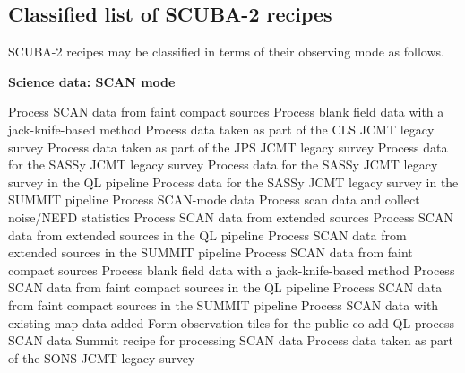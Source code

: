 \documentclass[twoside,11pt,nolof]{starlink}
\begin{document}
\newpage
\begin{small}
\section{Classified list of SCUBA-2 recipes\label{ap:classified}}

SCUBA-2 recipes may be classified in terms of their observing mode as
follows.

{\large
\begin{center}
\textbf{Science data: SCAN mode}
\end{center}
}

\begin{description}
Process SCAN data from faint compact sources
Process blank field data with a jack-knife-based method
Process data taken as part of the CLS JCMT legacy survey
Process data taken as part of the JPS JCMT legacy survey
Process data for the SASSy JCMT legacy survey
Process data for the SASSy JCMT legacy survey in the QL pipeline
Process data for the SASSy JCMT legacy survey in the SUMMIT pipeline
Process SCAN-mode data
Process scan data and collect noise/NEFD statistics
Process SCAN data from extended sources
Process SCAN data from extended sources in the QL pipeline
Process SCAN data from extended sources in the SUMMIT pipeline
Process SCAN data from faint compact sources
Process blank field data with a jack-knife-based method
Process SCAN data from faint compact sources in the QL pipeline
Process SCAN data from faint compact sources in the SUMMIT pipeline
Process SCAN data with existing map data added
Form observation tiles for the public co-add
QL process SCAN data
Summit recipe for processing SCAN data
Process data taken as part of the SONS JCMT legacy survey
\end{description}


\end{small}
\end{document}
